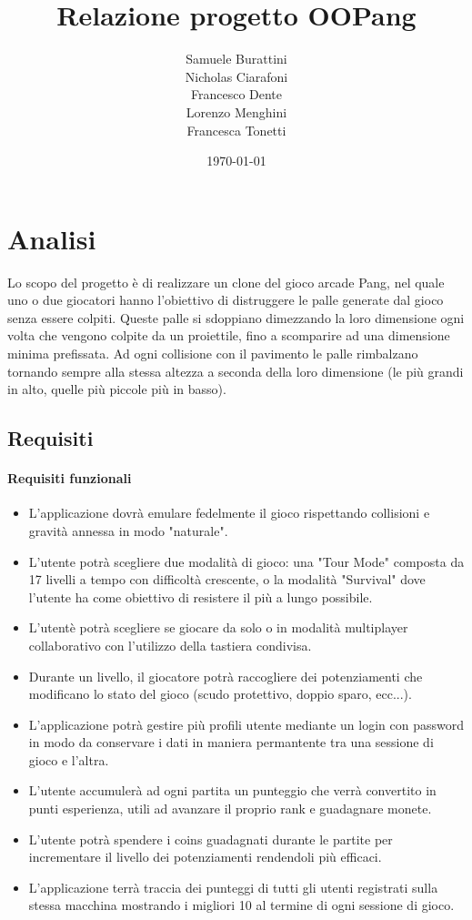 \documentclass[a4paper,12pt]{report}
\title{Relazione progetto OOPang}
\author{Samuele Burattini \\ Nicholas Ciarafoni \\ Francesco Dente \\ Lorenzo Menghini \\ Francesca Tonetti}
\date{\today}
\begin{document}
 
\maketitle

\tableofcontents

\chapter{Analisi}

Lo scopo del progetto è di realizzare un clone del gioco arcade Pang, nel quale uno o due giocatori hanno l'obiettivo di distruggere le palle generate dal gioco senza essere colpiti.
Queste palle si sdoppiano dimezzando la loro dimensione ogni volta che vengono colpite da un proiettile, fino a scomparire ad una dimensione minima prefissata.
Ad ogni collisione con il pavimento le palle rimbalzano tornando sempre alla stessa altezza a seconda della loro dimensione (le più grandi in alto, quelle più piccole più in basso).

\section{Requisiti}

\subsubsection{Requisiti funzionali}
\begin{itemize}
	\item L'applicazione dovrà emulare fedelmente il gioco rispettando collisioni e gravità annessa in modo "naturale".
	\item L'utente potrà scegliere due modalità di gioco: una "Tour Mode" composta da 17 livelli a tempo con difficoltà crescente, o la modalità "Survival" dove l'utente ha come obiettivo di resistere il più a lungo possibile.
	\item L'utentè potrà scegliere se giocare da solo o in modalità multiplayer collaborativo con l'utilizzo della tastiera condivisa.
	\item Durante un livello, il giocatore potrà raccogliere dei potenziamenti che modificano lo stato del gioco (scudo protettivo, doppio sparo, ecc...).
	\item L'applicazione potrà gestire più profili utente mediante un login con password in modo da conservare i dati in maniera permantente tra una sessione di gioco e l'altra.
	\item L'utente accumulerà ad ogni partita un punteggio che verrà convertito in punti esperienza, utili ad avanzare il proprio rank e guadagnare monete.
	\item L'utente potrà spendere i coins guadagnati durante le partite per incrementare il livello dei potenziamenti rendendoli più efficaci.
	\item L'applicazione terrà traccia dei punteggi di tutti gli utenti registrati sulla stessa macchina mostrando i migliori 10 al termine di ogni sessione di gioco.
\end{itemize}
\end{document}
